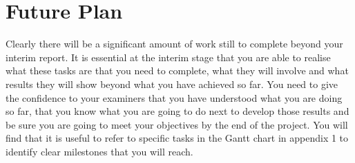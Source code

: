 \chapter{Future Plan}
Clearly there will be a significant amount of work still to complete beyond your interim report. It is essential at the interim stage that you are able to realise what these tasks are that you need to complete, what they will involve and what results they will show beyond what you have achieved so far. You need to give the confidence to your examiners that you have understood what you are doing so far, that you know what you are going to do next to develop those results and be sure you are going to meet your objectives by the end of the project. You will find that it is useful to refer to specific tasks in the Gantt chart in appendix 1 to identify clear milestones that you will reach.